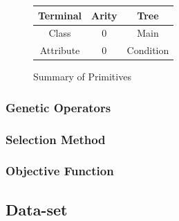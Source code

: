 \documentclass[a4paper,12pt]{article}
\begin{document}
{\begin{figure}[h!]
                        \begin{minipage}[c]{0.5\textwidth}
                        \centering
                        \begin{tabular}{|c|c|c|}
                            \hline
                            \textbf{Terminal} & \textbf{Arity} & \textbf{Tree}\\
                            \hline
                            Class & 0 & Main \\
                            \hline
                            Attribute & 0 & Condition  \\
                            \hline  
                        \end{tabular}
                    \end{minipage}
                    \caption{Summary of Primitives}
                \end{figure}

                

                
            }
        \subsubsection*{Genetic Operators}\label{subsubsec:geneticoperators}
        \subsubsection*{Selection Method} \label{subsubsec:selection}
        \subsubsection*{Objective Function}
    \subsection{Data-set}
\end{document}
